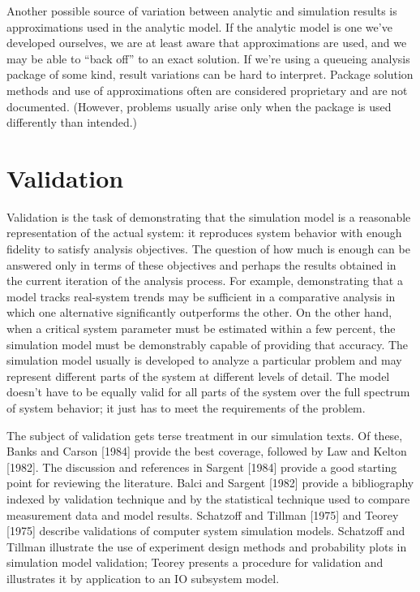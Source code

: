 Another possible source of variation between analytic and simulation results is
approximations used in the analytic model. If the analytic model is one we've
developed ourselves, we are at least aware that approximations are used, and we
may be able to ``back off'' to an exact solution. If we're using a queueing
analysis package of some kind, result variations can be hard to interpret.
Package solution methods and use of approximations often are considered
proprietary and are not documented. (However, problems usually arise only when
the package is used differently than intended.)

\section{Validation}
\label{sec:validation}

Validation is the task of demonstrating that the simulation model is a
reasonable representation of the actual system: it reproduces system behavior
with enough fidelity to satisfy analysis objectives. The question of how much
is enough can be answered only in terms of these objectives and perhaps the
results obtained in the current iteration of the analysis process. For
example, demonstrating that a model tracks real-system trends may be
sufficient in a comparative analysis in which one alternative significantly
outperforms the other. On the other hand, when a critical system parameter
must be estimated within a few percent, the simulation model must be
demonstrably capable of providing that accuracy. The simulation model usually
is developed to analyze a particular problem and may represent different parts
of the system at different levels of detail. The model doesn't have to be
equally valid for all parts of the system over the full spectrum of system
behavior; it just has to meet the requirements of the problem.

The subject of validation gets terse treatment in our simulation texts. Of
these, Banks and Carson [1984] provide the best coverage, followed by Law and
Kelton [1982]. The discussion and references in Sargent [1984] provide a good
starting point for reviewing the literature. Balci and Sargent [1982] provide
a bibliography indexed by validation technique and by the statistical
technique used to compare measurement data and model results. Schatzoff and
Tillman [1975] and Teorey [1975] describe validations of computer system
simulation models. Schatzoff and Tillman illustrate the use of experiment
design methods and probability plots in simulation model validation; Teorey
presents a procedure for validation and illustrates it by application to an IO
subsystem model.

